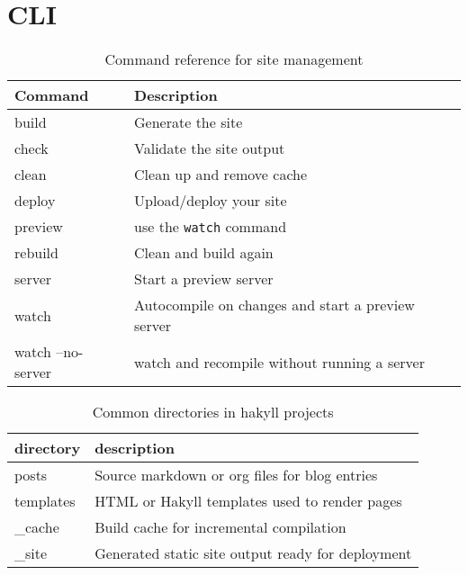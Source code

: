 \documentclass[openany, 12pt]{book}
\begin{document}
\chapter{CLI}
\begin{table}[h]
  \centering
  \begin{tabular}{ll}
    \toprule
    \textbf{Command}  & \textbf{Description}                              \\
    \midrule
    build             & Generate the site                                 \\
    check             & Validate the site output                          \\
    clean             & Clean up and remove cache                         \\
    deploy            & Upload/deploy your site                           \\
    preview           & use the \texttt{watch} command                    \\
    rebuild           & Clean and build again                             \\
    server            & Start a preview server                            \\
    watch             & Autocompile on changes and start a preview server \\
    watch --no-server & watch and recompile without running a server      \\
    \bottomrule
  \end{tabular}
  \caption{Command reference for site management}
\end{table}

\begin{table}[h]
  \centering
  \begin{center}
    \begin{tabular}{ll}
      \toprule
      directory & description                                       \\
      \midrule
      posts     & Source markdown or org files for blog entries     \\
      templates & HTML or Hakyll templates used to render pages     \\
      \_cache   & Build cache for incremental compilation           \\
      \_site    & Generated static site output ready for deployment \\
      \bottomrule
    \end{tabular}
  \end{center}
  \caption{Common directories in hakyll projects}
\end{table}
\end{document}
